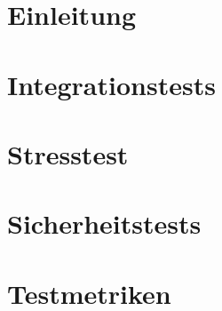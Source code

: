 \documentclass[a4paper,11pt]{article}
\begin{document}

    \tableofcontents


    \newpage

    \section{Einleitung}\label{sec:einleitung}
    

    \section{Integrationstests}\label{sec:integrationstests}
    

    \section{Stresstest}\label{sec:stresstest}
    

    \section{Sicherheitstests}\label{sec:sicherheitstests}
    

    \section{Testmetriken}\label{sec:testmetriken}
    
\end{document}
